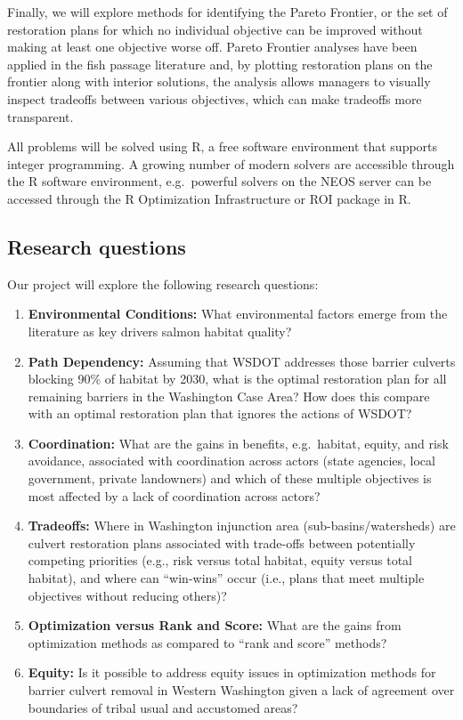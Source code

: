 Finally, we will explore methods for identifying the Pareto Frontier, or the set of restoration plans for which no individual objective can be improved without making at least one objective worse off. Pareto Frontier analyses have been applied in the fish passage literature \citep[e.g.][]{couto_safeguarding_2021} and, by plotting restoration plans on the frontier along with interior solutions, the analysis allows managers to visually inspect tradeoffs between various objectives, which can make tradeoffs more transparent.

All problems will be solved using R, a free software environment that supports integer programming. A growing number of modern solvers are accessible through the R software environment, e.g.\ powerful solvers on the NEOS server can be accessed through the R Optimization Infrastructure or ROI package in R.

\subsection*{Research questions}

Our project will explore the following research questions:

\begin{enumerate}
\item \textbf{Environmental Conditions:} What environmental factors emerge from the literature as key drivers salmon habitat quality?
\item \textbf{Path Dependency:} Assuming that WSDOT addresses those barrier culverts blocking 90\% of habitat by 2030, what is the optimal restoration plan for all remaining barriers in the Washington Case Area? How does this compare with an optimal restoration plan that ignores the actions of WSDOT?
\item \textbf{Coordination:} What are the gains in benefits, e.g.\ habitat, equity, and risk avoidance, associated with coordination across actors (state agencies, local government, private landowners) and which of these multiple objectives is most affected by a lack of coordination across actors? 
\item \textbf{Tradeoffs:} Where in Washington injunction area (sub-basins/watersheds) are culvert restoration plans associated with trade-offs between potentially competing priorities (e.g., risk versus total habitat, equity versus total habitat), and where can ``win-wins'' occur (i.e., plans that meet multiple objectives without reducing others)? 
\item \textbf{Optimization versus Rank and Score:} What are the gains from optimization methods as compared to ``rank and score'' methods?
\item \textbf{Equity:} Is it possible to address equity issues in optimization methods for barrier culvert removal in Western Washington given a lack of agreement over boundaries of tribal usual and accustomed areas?
\end{enumerate}

